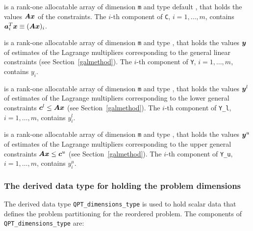 \documentclass{galahad}
\begin{document}
\begin{description}
 is a rank-one allocatable array of dimension {\tt m} and type default 
\realdp, that holds
the values ${\bm{A}} {\bm{x}}$ of the constraints.
The $i$-th component of {\tt C}, $i = 1,  \ldots ,  m$, contains 
${\bm{a}}_{i}^{T}{\bm{x}} \equiv ({\bm{A}} {\bm{x}})_{i}$.  

 is a rank-one allocatable array of dimension {\tt m} and type 
\realdp, that holds
the values ${\bm{y}}$ of estimates  of the Lagrange multipliers
corresponding to the general linear constraints (see Section~\ref{galmethod}).
The $i$-th component of {\tt Y}, $i = 1,  \ldots ,  m$, contains $y_{i}$.  

 is a rank-one allocatable array of dimension {\tt m} and 
type \realdp, that holds
the values ${\bm{y}}^{l}$ of estimates  of the Lagrange multipliers
corresponding to the lower general constraints ${\bm{c}}^{l} \leq {\bm{A}} {\bm{x}}$
(see Section~\ref{galmethod}).
The $i$-th component of {\tt Y\_l}, $i = 1,  \ldots ,  m$, 
contains $y_{i}^{l}$.  

 is a rank-one allocatable array of dimension {\tt m} and 
type \realdp, that holds
the values ${\bm{y}}^{u}$ of estimates  of the Lagrange multipliers
corresponding to the upper general constraints ${\bm{A}} {\bm{x}} \leq {\bm{c}}^{u}$
(see Section~\ref{galmethod}).
The $i$-th component of {\tt Y\_u}, $i = 1,  \ldots ,  m$, 
contains $y_{i}^{u}$.  

\end{description}



\subsubsection{The derived data type for holding the problem dimensions}
\label{typeprob}
The derived data type 
{\tt QPT\_dimensions\_type} 
is used to hold scalar data that defines the problem partitioning for the
reordered problem. 
The components of 
{\tt QPT\_dimensions\_type} 
are:
\end{document}
